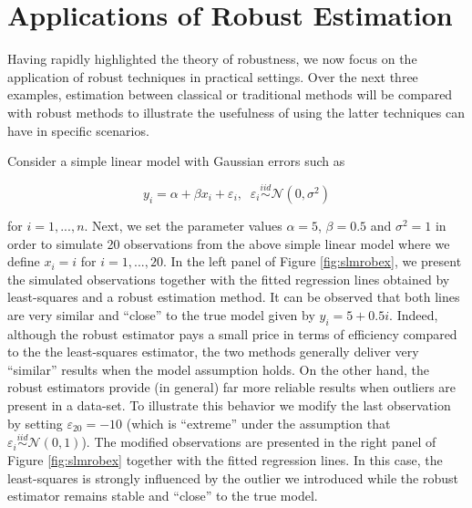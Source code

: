 \documentclass[]{book}
\theoremstyle{definition}
\theoremstyle{definition}
\theoremstyle{definition}
\theoremstyle{remark}
\let\BeginKnitrBlock\begin \let\EndKnitrBlock\end
\begin{document}
\hypertarget{applications-of-robust-estimation}{%
\section{Applications of Robust
Estimation}\label{applications-of-robust-estimation}}

Having rapidly highlighted the theory of robustness, we now focus on the
application of robust techniques in practical settings. Over the next
three examples, estimation between classical or traditional methods will
be compared with robust methods to illustrate the usefulness of using
the latter techniques can have in specific scenarios.

\BeginKnitrBlock{example}
\protect\hypertarget{exm:slmrobust}{}{\label{exm:slmrobust} } Consider a
simple linear model with Gaussian errors such as

\begin{equation}
        y_i = \alpha + \beta x_i + \varepsilon_i, \;\; \varepsilon_i \overset{iid}{\sim} \mathcal{N}(0,\sigma^2)
  \label{eq:exam}
\end{equation}

for \(i = 1,...,n\). Next, we set the parameter values \(\alpha = 5\),
\(\beta = 0.5\) and \(\sigma^2 = 1\) in order to simulate 20
observations from the above simple linear model where we define
\(x_i = i\) for \(i = 1,...,20\). In the left panel of Figure
\ref{fig:slmrobex}, we present the simulated observations together with
the fitted regression lines obtained by least-squares and a robust
estimation method. It can be observed that both lines are very similar
and ``close'' to the true model given by \(y_i = 5 + 0.5 i\). Indeed,
although the robust estimator pays a small price in terms of efficiency
compared to the the least-squares estimator, the two methods generally
deliver very ``similar'' results when the model assumption holds. On the
other hand, the robust estimators provide (in general) far more reliable
results when outliers are present in a data-set. To illustrate this
behavior we modify the last observation by setting
\(\varepsilon_{20} = -10\) (which is ``extreme'' under the assumption
that \(\varepsilon_i \overset{iid}{\sim} \mathcal{N}(0,1)\)). The
modified observations are presented in the right panel of Figure
\ref{fig:slmrobex} together with the fitted regression lines. In this
case, the least-squares is strongly influenced by the outlier we
introduced while the robust estimator remains stable and ``close'' to
the true model.
\EndKnitrBlock{example}
\end{document}
